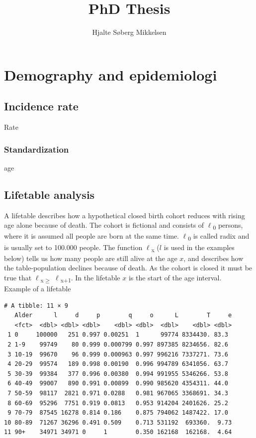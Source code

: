 \documentclass{article}
\author{Hjalte Søberg Mikkelsen}
\affil{Steno Diabetes Center Copenhagen}
\date{}
\title{PhD Thesis}
\begin{document}
\maketitle

\section*{Demography and epidemiologi}
\label{sec:org8f9b1a0}

\subsection*{Incidence rate}
\label{sec:orgcd699ab}

Rate

\subsubsection*{Standardization}
\label{sec:org9302da3}

age


\subsection*{Lifetable analysis}
\label{sec:orgd0ba5e2}
A lifetable describes how a hypothetical closed birth cohort reduces with rising age alone because of death. The cohort is fictional and consists of \(\ell\)\textsubscript{0} persons, where it is assumed all people are born at the same time. \(\ell\)\textsubscript{0} is called radix and is usually set to 100.000 people. The function \(\ell\)\textsubscript{x} (\(l\) is used in the examples below) tells us how many people are still alive at the age \(x\), and describes how the table-population declines because of death. As the cohort is closed it must be true that \(\ell\)\textsubscript{x\(\ge\)} \(\ell\)\textsubscript{x+1}. In the lifetable \(x\) is the start of the age interval.\\[0pt]

Example of a lifetable
\begin{verbatim}
# A tibble: 11 × 9
   Alder      l     d     p        q     o      L        T     e
   <fct>  <dbl> <dbl> <dbl>    <dbl> <dbl>  <dbl>    <dbl> <dbl>
 1 0     100000   251 0.997 0.00251  1      99774 8334430. 83.3 
 2 1-9    99749    80 0.999 0.000799 0.997 897385 8234656. 82.6 
 3 10-19  99670    96 0.999 0.000963 0.997 996216 7337271. 73.6 
 4 20-29  99574   189 0.998 0.00190  0.996 994789 6341056. 63.7 
 5 30-39  99384   377 0.996 0.00380  0.994 991955 5346266. 53.8 
 6 40-49  99007   890 0.991 0.00899  0.990 985620 4354311. 44.0 
 7 50-59  98117  2821 0.971 0.0288   0.981 967065 3368691. 34.3 
 8 60-69  95296  7751 0.919 0.0813   0.953 914204 2401626. 25.2 
 9 70-79  87545 16278 0.814 0.186    0.875 794062 1487422. 17.0 
10 80-89  71267 36296 0.491 0.509    0.713 531192  693360.  9.73
11 90+    34971 34971 0     1        0.350 162168  162168.  4.64
\end{verbatim}
\end{document}
